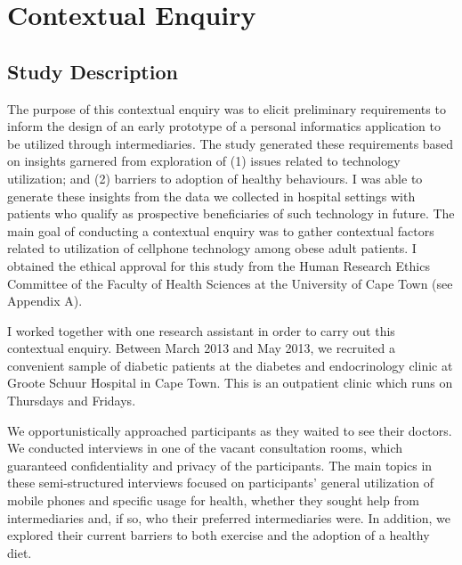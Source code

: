 
\chapter{Contextual Enquiry} %

\label{contextualenqchapter} %


\section{Study Description}
The purpose of this contextual enquiry was to elicit preliminary requirements to inform the design of an early prototype of a personal informatics application to be utilized through intermediaries. The study generated these requirements based on insights garnered from exploration of (1) issues related  to technology utilization; and (2) barriers to adoption of healthy behaviours. I was able to generate these insights from the data we collected in hospital settings with patients who qualify as prospective beneficiaries of such technology in future. The main goal of conducting a contextual enquiry was to gather contextual factors related to utilization of cellphone technology among obese adult patients. I obtained the ethical approval for this study from the Human Research Ethics Committee of the Faculty of Health Sciences at the University of Cape Town (see Appendix A).

I worked together with one research assistant in order to carry out this contextual enquiry. Between March 2013 and May 2013, we recruited a convenient sample of diabetic patients at the diabetes and endocrinology clinic at Groote Schuur Hospital in Cape Town. This is an outpatient clinic which runs on Thursdays and Fridays.

We opportunistically approached participants as they waited to see their doctors. We conducted interviews in one of the vacant consultation rooms, which guaranteed confidentiality and privacy of the participants. The main topics in these semi-structured interviews focused on participants' general utilization of mobile phones and specific usage for health, whether they sought help from intermediaries and, if so, who their preferred intermediaries were. In addition, we explored their current barriers to both exercise  and the adoption of a healthy diet.

